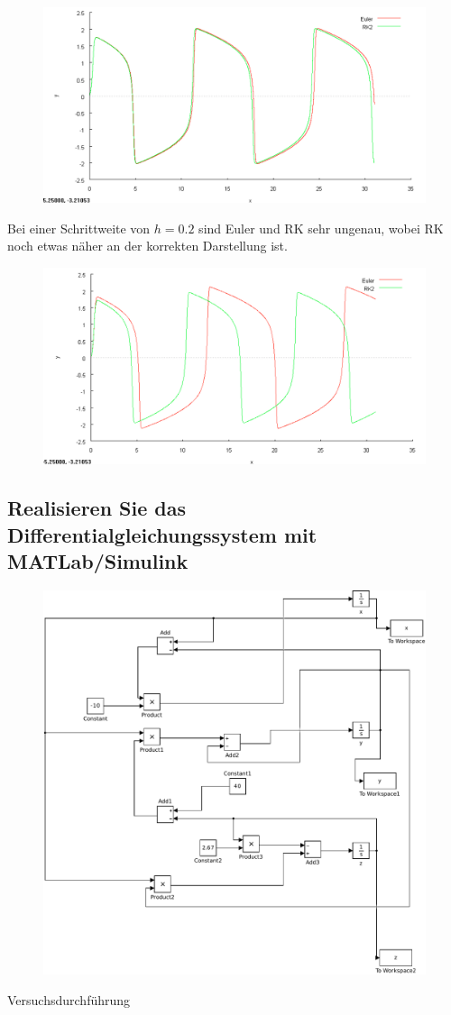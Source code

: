 \documentclass[10pt,a4paper]{article}
\begin{document}
\begin{figure}[h]
\centering
\includegraphics[width=0.9\linewidth]{../screenshots/van001.png}
\end{figure}
Bei einer Schrittweite von $h = 0.2$ sind Euler und RK sehr ungenau, wobei RK noch etwas näher an der korrekten Darstellung ist.
\begin{figure}[h]
\centering
\includegraphics[width=0.9\linewidth]{../screenshots/van02.png}
\end{figure}

\subsection{Realisieren Sie das Differentialgleichungssystem mit MATLab/Simulink}
\begin{figure}[h]
\centering
\includegraphics[width=0.9\linewidth]{../screenshots/3}
\end{figure}

\begin{center}
\begin{large}
Versuchsdurchführung
\end{large}
\end{center}
\end{document}
